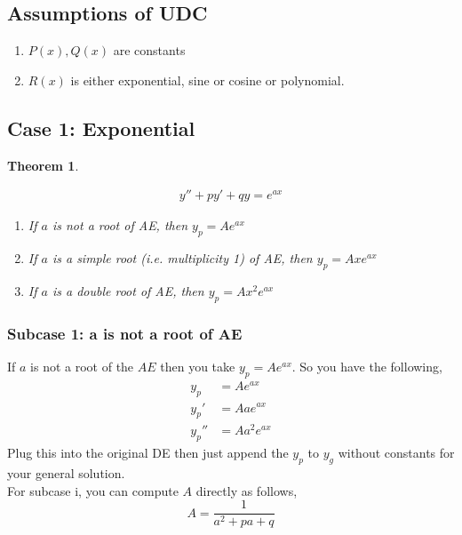 \documentclass[oneside,11pt,pdftex,final]{book}%
\numberwithin{equation}{section}
\newtheorem{theorem}{Theorem}[chapter]%
\newtheorem{example}[theorem]{Example}
\numberwithin{section}{chapter}
\numberwithin{equation}{chapter}
\begin{document}
\subsection{Assumptions of UDC}
\begin{enumerate}
	\item $ P(x),Q(x) $ are constants
	\item $ R(x) $ is either exponential, sine or cosine or polynomial.
\end{enumerate}

\subsection{Case 1: Exponential}
\begin{theorem}\label{th:udcexp}


\begin{align}
	y''+py'+qy=e^{ax} \label{eq:udcexp}
\end{align}
\begin{enumerate}
	\item If $ a $ is not a root of AE, then $ y_p =Ae^{ax}$
	\item If $ a $ is a simple root (i.e. multiplicity 1) of AE, then $ y_p=Ax e^{ax} $
	\item If $ a $ is a double root of AE, then $ y_p=A x^2 e^{ax} $
\end{enumerate}
\end{theorem}

\subsubsection{Subcase 1: a is not a root of AE}
If $ a $ is not a root of the $ AE $ then you take $ y_p=Ae^{ax}$. So you have the following,
\begin{align*}
	y_p&=Ae^{ax}\\
	y_p'&=Aae^{ax}\\
	y_p''&=Aa^2e^{ax}
\end{align*}
Plug this into the original DE then just append the $ y_p $ to $ y_g $ without constants for your general solution.\\

For subcase i, you can compute $ A $ directly as follows, \[ A=\frac{1}{a^2+pa+q} \]
\end{document}
